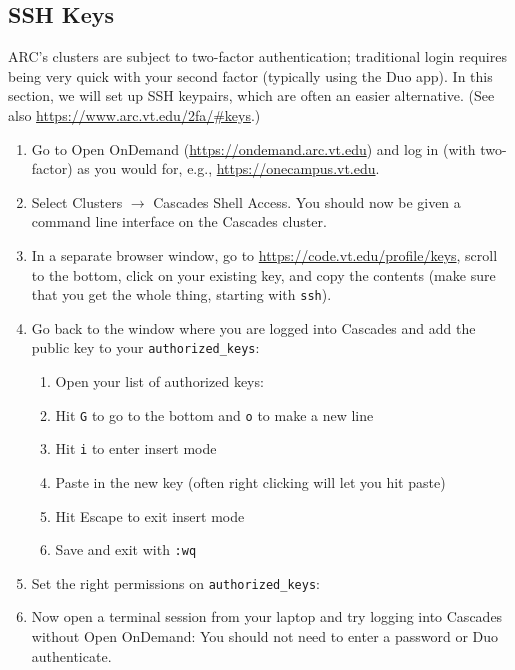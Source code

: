 \subsection{SSH Keys}
ARC's clusters are subject to two-factor authentication; traditional login requires being very quick with your second factor (typically using the Duo app). In this section, we will set up SSH keypairs, which are often an easier alternative. (See also \url{https://www.arc.vt.edu/2fa/#keys}.)
\begin{enumerate}
  \item Go to Open OnDemand (\url{https://ondemand.arc.vt.edu}) and log in (with two-factor) as you would for, e.g., \url{https://onecampus.vt.edu}.
  \item Select Clusters $\to$ Cascades Shell Access. You should now be given a command line interface on the Cascades cluster.
  \item In a separate browser window, go to \url{https://code.vt.edu/profile/keys}, scroll to the bottom, click on your existing key, and copy the contents (make sure that you get the whole thing, starting with \texttt{ssh}).
  \item Go back to the window where you are logged into Cascades and add the public key to your \texttt{authorized\_keys}:
    \begin{enumerate}
      \item Open your list of authorized keys:
      \item Hit \texttt{G} to go to the bottom and \texttt{o} to make a new line
      \item Hit \texttt{i} to enter insert mode
      \item Paste in the new key (often right clicking will let you hit paste)
      \item Hit Escape to exit insert mode
      \item Save and exit with \texttt{:wq}
    \end{enumerate}
  \item Set the right permissions on \texttt{authorized\_keys}:
  \item Now open a terminal session from your laptop and try logging into Cascades without Open OnDemand:
    You should not need to enter a password or Duo authenticate.
\end{enumerate}

